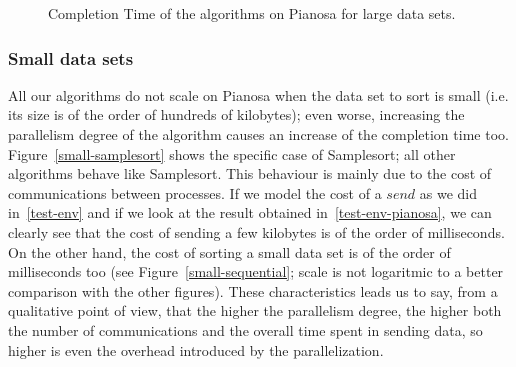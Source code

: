 \begin{figure}[p]
	\centering
  	\hspace*{20pt}
  	
	\caption{Completion Time of the algorithms on Pianosa for large data sets.}
	\label{large-tc}
\end{figure}
 
\subsubsection*{Small data sets}
All our algorithms do not scale on Pianosa when the data set to sort is small (i.e. its size is of the order of hundreds of kilobytes); even worse, increasing the parallelism degree of the algorithm causes an increase of the completion time too. Figure~\ref{small-samplesort} shows the specific case of Samplesort; all other algorithms behave like Samplesort. This behaviour is mainly due to the cost of communications between processes. If we model the cost of a $send$ as we did in~\ref{test-env} and if we look at the result obtained in~\ref{test-env-pianosa}, we can clearly see that the cost of sending a few kilobytes is of the order of milliseconds. On the other hand, the cost of sorting a small data set is of the order of milliseconds too (see Figure~\ref{small-sequential}; scale is not logaritmic to a better comparison with the other figures). These characteristics leads us to say, from a qualitative point of view, that the higher the parallelism degree, the higher both the number of communications and the overall time spent in sending data, so higher is even the overhead introduced by the parallelization. 

